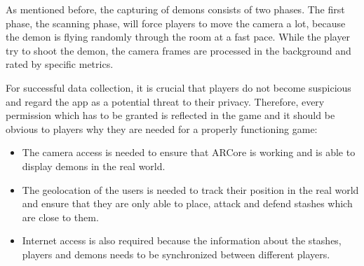 As mentioned before, the capturing of demons consists of two phases.
The first phase, the scanning phase, will force players to move the camera a lot, because the demon is flying randomly through the room at a fast pace.
While the player try to shoot the demon, the camera frames are processed in the background and rated by specific metrics.


For successful data collection, it is crucial that players do not become suspicious and regard the app as a potential threat to their privacy.
Therefore, every permission which has to be granted is reflected in the game and it should be obvious to players why they are needed for a properly functioning game:
\begin{itemize}
    \item The camera access is needed to ensure that ARCore is working and is able to display demons in the real world.
    \item The geolocation of the users is needed to track their position in the real world and ensure that they are only able to place, attack and defend stashes which are close to them.
    \item Internet access is also required because the information about the stashes, players and demons needs to be synchronized between different players.
\end{itemize}

 

